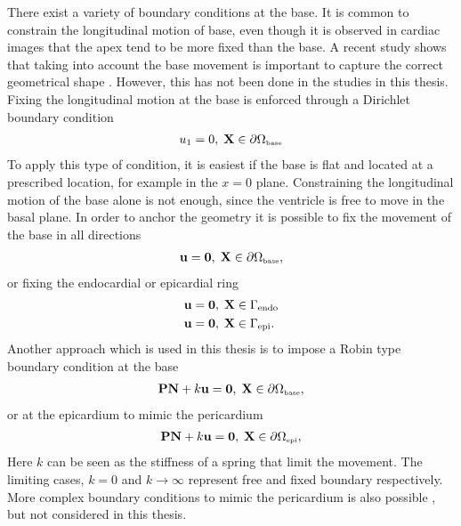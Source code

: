 There exist a variety of boundary conditions at the base.
It is common to constrain the longitudinal motion of
base, even though it is observed in cardiac images that the apex tend
to be more fixed than the base. A recent study shows that taking into
account the base movement is important to capture the correct
geometrical shape \cite{palit2016passive}. However, this has not been
done in the studies in this thesis.
Fixing the longitudinal motion at the base is enforced through a
Dirichlet boundary condition
\begin{align}
  u_1 = 0,  \;  \mathbf{X} \in \partial \Omega_{ \textnormal{\tiny\text{base}}}
\end{align}
To apply this type of condition, it is easiest if the base is
flat and located at a prescribed location, for example in the $x= 0$
plane.
Constraining the longitudinal motion of the base alone is not enough,
since the ventricle is free to move in the basal plane. In order to
anchor the geometry it is possible to fix the movement of the base in
all directions
\begin{align}
  \mathbf{u} = \mathbf{0},  \;  \mathbf{X} \in \partial \Omega_{ \textnormal{\tiny\text{base}}},
\end{align}
or fixing the endocardial or epicardial ring
\begin{align}
  \mathbf{u} &= \mathbf{0},  \;  \mathbf{X} \in \Gamma_{\mathrm{endo}} \\
  \mathbf{u} &= \mathbf{0},  \;  \mathbf{X} \in \Gamma_{\mathrm{epi}}.
\end{align}
Another approach which is used in this thesis is to impose a Robin
type boundary condition at the base
\begin{align}
  \mathbf{P} \mathbf{N} + k \mathbf{u} = \mathbf{0},  \;  \mathbf{X} \in \partial \Omega_{ \textnormal{\tiny\text{base}}}, 
\end{align}
or at the epicardium to mimic the pericardium
\begin{align}
  \mathbf{P} \mathbf{N} + k \mathbf{u} = \mathbf{0},  \;  \mathbf{X} \in \partial \Omega_{ \textnormal{\tiny \text{epi}}}, 
\end{align}
Here $k$ can be seen as the stiffness of a spring that limit the
movement. The limiting cases, $k = 0$ and $k \rightarrow
\infty$ represent free and fixed boundary respectively.
More complex boundary conditions to mimic the pericardium is also
possible \cite{fritz2014simulation}, but not considered in this thesis.



